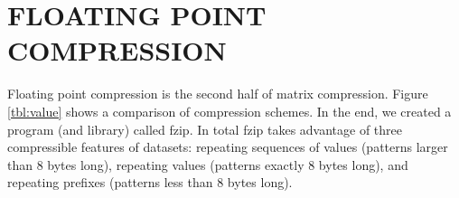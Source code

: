 \chapter{FLOATING POINT COMPRESSION}
\label{chapter:fzip}
\newif\ifshort

\shorttrue

\newif\ifbwtsec

\bwtsecfalse
Floating point compression is the second half of matrix compression. Figure \ref{tbl:value} shows a comparison of compression schemes. In the end, we created a program (and library) called fzip. In total fzip takes advantage of three compressible features of datasets: repeating sequences of values (patterns larger than 8 bytes long), repeating values (patterns exactly 8 bytes long), and repeating prefixes (patterns less than 8 bytes long).

